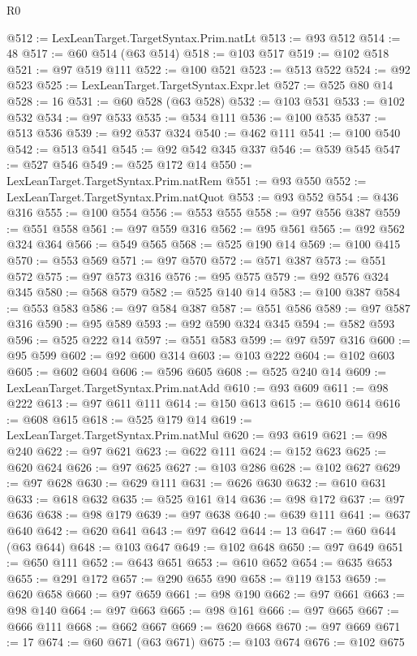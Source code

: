 \begin{lexlean}{R0}
\begin{coremodule}
@512 := LexLeanTarget.TargetSyntax.Prim.natLt
@513 := @93 @512
@514 := 48
@517 := @60 @514 (@63 @514)
@518 := @103 @517
@519 := @102 @518
@521 := @97 @519 @111
@522 := @100 @521
@523 := @513 @522
@524 := @92 @523
@525 := LexLeanTarget.TargetSyntax.Expr.let
@527 := @525 @80 @14
@528 := 16
@531 := @60 @528 (@63 @528)
@532 := @103 @531
@533 := @102 @532
@534 := @97 @533
@535 := @534 @111
@536 := @100 @535
@537 := @513 @536
@539 := @92 @537 @324
@540 := @462 @111
@541 := @100 @540
@542 := @513 @541
@545 := @92 @542 @345 @337
@546 := @539 @545
@547 := @527 @546
@549 := @525 @172 @14
@550 := LexLeanTarget.TargetSyntax.Prim.natRem
@551 := @93 @550
@552 := LexLeanTarget.TargetSyntax.Prim.natQuot
@553 := @93 @552
@554 := @436 @316
@555 := @100 @554
@556 := @553 @555
@558 := @97 @556 @387
@559 := @551 @558
@561 := @97 @559 @316
@562 := @95 @561
@565 := @92 @562 @324 @364
@566 := @549 @565
@568 := @525 @190 @14
@569 := @100 @415
@570 := @553 @569
@571 := @97 @570
@572 := @571 @387
@573 := @551 @572
@575 := @97 @573 @316
@576 := @95 @575
@579 := @92 @576 @324 @345
@580 := @568 @579
@582 := @525 @140 @14
@583 := @100 @387
@584 := @553 @583
@586 := @97 @584 @387
@587 := @551 @586
@589 := @97 @587 @316
@590 := @95 @589
@593 := @92 @590 @324 @345
@594 := @582 @593
@596 := @525 @222 @14
@597 := @551 @583
@599 := @97 @597 @316
@600 := @95 @599
@602 := @92 @600 @314
@603 := @103 @222
@604 := @102 @603
@605 := @602 @604
@606 := @596 @605
@608 := @525 @240 @14
@609 := LexLeanTarget.TargetSyntax.Prim.natAdd
@610 := @93 @609
@611 := @98 @222
@613 := @97 @611 @111
@614 := @150 @613
@615 := @610 @614
@616 := @608 @615
@618 := @525 @179 @14
@619 := LexLeanTarget.TargetSyntax.Prim.natMul
@620 := @93 @619
@621 := @98 @240
@622 := @97 @621
@623 := @622 @111
@624 := @152 @623
@625 := @620 @624
@626 := @97 @625
@627 := @103 @286
@628 := @102 @627
@629 := @97 @628
@630 := @629 @111
@631 := @626 @630
@632 := @610 @631
@633 := @618 @632
@635 := @525 @161 @14
@636 := @98 @172
@637 := @97 @636
@638 := @98 @179
@639 := @97 @638
@640 := @639 @111
@641 := @637 @640
@642 := @620 @641
@643 := @97 @642
@644 := 13
@647 := @60 @644 (@63 @644)
@648 := @103 @647
@649 := @102 @648
@650 := @97 @649
@651 := @650 @111
@652 := @643 @651
@653 := @610 @652
@654 := @635 @653
@655 := @291 @172
@657 := @290 @655 @90
@658 := @119 @153
@659 := @620 @658
@660 := @97 @659
@661 := @98 @190
@662 := @97 @661
@663 := @98 @140
@664 := @97 @663
@665 := @98 @161
@666 := @97 @665
@667 := @666 @111
@668 := @662 @667
@669 := @620 @668
@670 := @97 @669
@671 := 17
@674 := @60 @671 (@63 @671)
@675 := @103 @674
@676 := @102 @675

\end{coremodule}
\end{lexlean}

